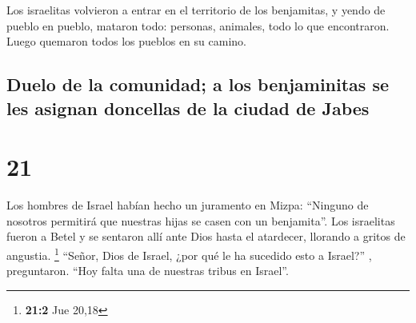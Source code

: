  Los israelitas volvieron a entrar en el territorio de
los benjamitas, y yendo de pueblo en pueblo, mataron todo: personas,
animales, todo lo que encontraron. Luego quemaron todos los pueblos en
su camino.

\hypertarget{duelo-de-la-comunidad-a-los-benjaminitas-se-les-asignan-doncellas-de-la-ciudad-de-jabes}{%
\subsection{Duelo de la comunidad; a los benjaminitas se les asignan
doncellas de la ciudad de
Jabes}\label{duelo-de-la-comunidad-a-los-benjaminitas-se-les-asignan-doncellas-de-la-ciudad-de-jabes}}

\hypertarget{section-20}{%
\section{21}\label{section-20}}

 Los hombres de Israel habían hecho un juramento en Mizpa:
``Ninguno de nosotros permitirá que nuestras hijas se casen con un
benjamita''.  Los israelitas fueron a Betel y se sentaron
allí ante Dios hasta el atardecer, llorando a gritos de angustia.
\footnote{\textbf{21:2} Jue 20,18}  ``Señor, Dios de
Israel, ¿por qué le ha sucedido esto a Israel?'' , preguntaron. ``Hoy
falta una de nuestras tribus en Israel''.


